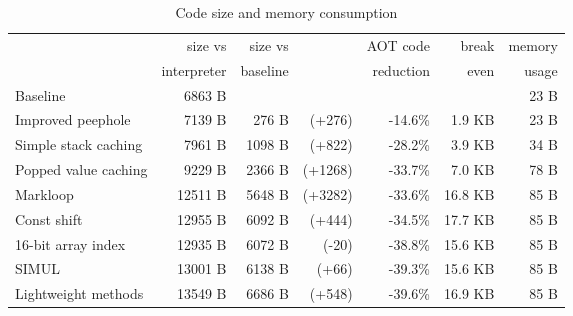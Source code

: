 
\begin{table}
\centering
\caption{Code size and memory consumption}
\label{tbl-code-size-and-memory-consumption}
    \begin{tabular}{lrrrrrr}
    \toprule
                              & size vs     & size vs  &                      & AOT code  &   break & memory    \\
                              & interpreter & baseline &                      & reduction &   even  & usage     \\
    \midrule
    \midrule
    Baseline                  &     6863 B  &          &                      &           &         & 23 B      \\
    Improved peephole         &     7139 B  &   276 B  & \scriptsize   (+276) &  -14.6\%  &  1.9 KB & 23 B      \\
    Simple stack caching      &     7961 B  &  1098 B  & \scriptsize   (+822) &  -28.2\%  &  3.9 KB & 34 B      \\
    Popped value caching      &     9229 B  &  2366 B  & \scriptsize  (+1268) &  -33.7\%  &  7.0 KB & 78 B      \\
    Markloop                  &    12511 B  &  5648 B  & \scriptsize  (+3282) &  -33.6\%  & 16.8 KB & 85 B      \\
    Const shift               &    12955 B  &  6092 B  & \scriptsize   (+444) &  -34.5\%  & 17.7 KB & 85 B      \\
    16-bit array index        &    12935 B  &  6072 B  & \scriptsize    (-20) &  -38.8\%  & 15.6 KB & 85 B      \\
    SIMUL                     &    13001 B  &  6138 B  & \scriptsize    (+66) &  -39.3\%  & 15.6 KB & 85 B      \\
    Lightweight methods       &    13549 B  &  6686 B  & \scriptsize   (+548) &  -39.6\%  & 16.9 KB & 85 B      \\
    \bottomrule
    \end{tabular}
\end{table}
